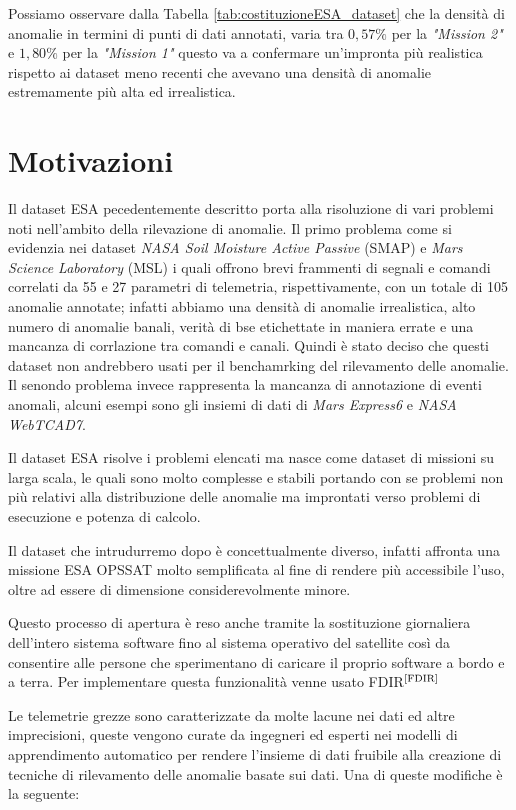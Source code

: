 Possiamo osservare dalla Tabella \ref{tab:costituzioneESA_dataset} che la densità di anomalie in termini di punti di dati annotati, varia tra $0,57\%$ per la \textit{"Mission 2"} e $1,80\%$ per la \textit{"Mission 1"} questo va a confermare un'impronta più realistica rispetto ai dataset meno recenti che avevano una densità di anomalie estremamente più alta ed irrealistica.

\section{Motivazioni}
Il dataset ESA pecedentemente descritto porta alla risoluzione di vari problemi noti nell'ambito della rilevazione di anomalie.
Il primo problema come si evidenzia nei dataset \textit{NASA Soil Moisture Active Passive} (SMAP) e  \textit{Mars Science Laboratory} (MSL) i quali offrono brevi frammenti di segnali e comandi correlati da 55 e 27 parametri di telemetria, rispettivamente, con un totale di 105 anomalie annotate; infatti abbiamo una densità di anomalie irrealistica, alto numero di anomalie banali, verità di bse etichettate in maniera errate e una mancanza di corrlazione tra comandi e canali. Quindi è stato deciso che questi dataset non andrebbero usati per il benchamrking del rilevamento delle anomalie.
Il senondo problema invece rappresenta la mancanza di annotazione di eventi anomali, alcuni esempi sono gli insiemi di dati di \textit{Mars Express6} e \textit{NASA WebTCAD7}.

Il dataset ESA risolve i problemi elencati ma nasce come dataset di missioni su larga scala, le quali sono molto complesse e stabili portando con se problemi non più relativi alla distribuzione delle anomalie ma improntati verso problemi di esecuzione e potenza di calcolo.

Il dataset che intrudurremo dopo è concettualmente diverso, infatti affronta una missione ESA OPS\textunderscore SAT molto semplificata al fine di rendere più accessibile l'uso, oltre ad essere di dimensione considerevolmente minore.

Questo processo di apertura è reso anche tramite la sostituzione giornaliera dell'intero sistema software fino al sistema operativo del satellite così da consentire alle persone che sperimentano di caricare il proprio software a bordo e a terra. Per implementare questa funzionalità venne usato FDIR$^{\text{\cite{FDIR}}}$

Le telemetrie grezze sono caratterizzate da molte lacune nei dati ed altre imprecisioni, queste vengono curate da ingegneri ed esperti nei modelli di apprendimento automatico per rendere l'insieme di dati fruibile alla creazione di tecniche di rilevamento delle anomalie basate sui dati.
Una di queste modifiche è la seguente:

